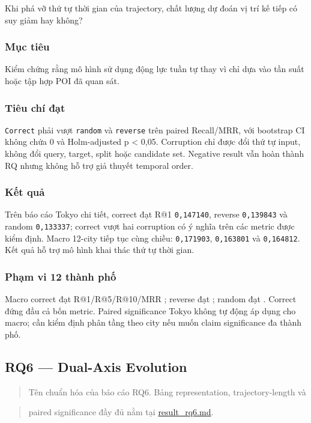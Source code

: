 Khi phá vỡ thứ tự thời gian của trajectory, chất lượng dự đoán vị trí kế tiếp có suy giảm hay không?

\subsubsection*{Mục tiêu}

Kiểm chứng rằng mô hình sử dụng động lực tuần tự thay vì chỉ dựa vào tần suất hoặc tập hợp POI đã quan sát.

\subsubsection*{Tiêu chí đạt}

\texttt{Correct} phải vượt \texttt{random} và \texttt{reverse} trên paired Recall/MRR, với bootstrap CI không chứa 0 và Holm-adjusted p < 0,05. Corruption chỉ được đổi thứ tự input, không đổi query, target, split hoặc candidate set. Negative result vẫn hoàn thành RQ nhưng không hỗ trợ giả thuyết temporal order.

\subsubsection*{Kết quả}

Trên báo cáo Tokyo chi tiết, correct đạt R@1 \texttt{0,147140}, reverse \texttt{0,139843} và random \texttt{0,133337}; correct vượt hai corruption có ý nghĩa trên các metric được kiểm định. Macro 12-city tiếp tục cùng chiều: \texttt{0,171903}, \texttt{0,163801} và \texttt{0,164812}. Kết quả hỗ trợ mô hình khai thác thứ tự thời gian.

\subsubsection*{Phạm vi 12 thành phố}

Macro correct đạt R@1/R@5/R@10/MRR ; reverse đạt ; random đạt . Correct đứng đầu cả bốn metric. Paired significance Tokyo không tự động áp dụng cho macro; cần kiểm định phân tầng theo city nếu muốn claim significance đa thành phố.


\subsection{RQ6 --- Dual-Axis Evolution}

\begin{quote}\small Tên chuẩn hóa của báo cáo RQ6. Bảng representation, trajectory-length và\end{quote}
\begin{quote}\small paired significance đầy đủ nằm tại \href{result\_rq6.md}{result\_rq6.md}.\end{quote}
